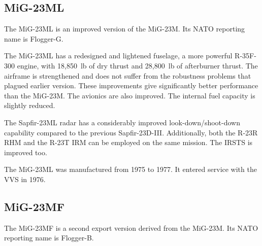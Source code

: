 \subsection{MiG-23ML}

The MiG-23ML is an improved version of the MiG-23M.
Its NATO reporting name is Flogger-G.%

The MiG-23ML has a redesigned and lightened fuselage, a more powerful R-35F-300 engine, with 18,850~lb of dry thrust and 28,800~lb of afterburner thrust. The airframe is strengthened and does not suffer from the robustness problems that plagued earlier version. These improvements give significantly better performance than the MiG-23M. The avionics are also improved. The internal fuel capacity is slightly reduced.

The Sapfir-23ML radar has a considerably improved look-down/shoot-down capability compared to the previous Sapfir-23D-III. Additionally, both the R-23R RHM and the R-23T IRM can be employed on the same mission. The IRSTS is improved too.

The MiG-23ML was manufactured from 1975 to 1977. It entered service with the VVS in 1976.%

\subsection{MiG-23MF}

The MiG-23MF is a second export version derived from the MiG-23M.
Its NATO reporting name is Flogger-B.

